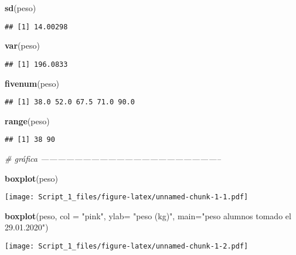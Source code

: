 \documentclass[
]{article}
\newenvironment{Shaded}{\begin{snugshade}}{\end{snugshade}}
\newcommand{\CommentTok}[1]{\textcolor[rgb]{0.56,0.35,0.01}{\textit{#1}}}
\newcommand{\DataTypeTok}[1]{\textcolor[rgb]{0.13,0.29,0.53}{#1}}
\newcommand{\KeywordTok}[1]{\textcolor[rgb]{0.13,0.29,0.53}{\textbf{#1}}}
\newcommand{\NormalTok}[1]{#1}
\newcommand{\StringTok}[1]{\textcolor[rgb]{0.31,0.60,0.02}{#1}}
\begin{document}
\begin{Shaded}
\begin{Highlighting}[]
 \KeywordTok{sd}\NormalTok{(peso) }
\end{Highlighting}
\end{Shaded}

\begin{verbatim}
## [1] 14.00298
\end{verbatim}

\begin{Shaded}
\begin{Highlighting}[]
 \KeywordTok{var}\NormalTok{(peso) }
\end{Highlighting}
\end{Shaded}

\begin{verbatim}
## [1] 196.0833
\end{verbatim}

\begin{Shaded}
\begin{Highlighting}[]
 \KeywordTok{fivenum}\NormalTok{(peso)}
\end{Highlighting}
\end{Shaded}

\begin{verbatim}
## [1] 38.0 52.0 67.5 71.0 90.0
\end{verbatim}

\begin{Shaded}
\begin{Highlighting}[]
 \KeywordTok{range}\NormalTok{(peso)}
\end{Highlighting}
\end{Shaded}

\begin{verbatim}
## [1] 38 90
\end{verbatim}

\begin{Shaded}
\begin{Highlighting}[]
\CommentTok{# gráfica -----------------------------------------------------------------}

 \KeywordTok{boxplot}\NormalTok{(peso)}
\end{Highlighting}
\end{Shaded}

\texttt{[image: Script\_1\_files/figure-latex/unnamed-chunk-1-1.pdf]}

\begin{Shaded}
\begin{Highlighting}[]
 \KeywordTok{boxplot}\NormalTok{(peso, }\DataTypeTok{col =} \StringTok{"pink"}\NormalTok{, }\DataTypeTok{ylab=} \StringTok{"peso (kg)"}\NormalTok{,}
         \DataTypeTok{main=}\StringTok{"peso alumnos tomado el 29.01.2020"}\NormalTok{)}
\end{Highlighting}
\end{Shaded}

\texttt{[image: Script\_1\_files/figure-latex/unnamed-chunk-1-2.pdf]}
\end{document}
